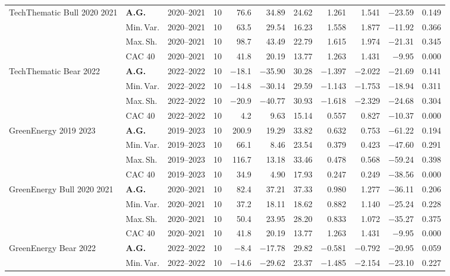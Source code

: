 \begin{longtable}{p{2.6cm} l c c r r r r r r r}
\midrule
TechThematic Bull 2020 2021 & \textbf{A.G.} & 2020--2021 & 10 & 76.6 & 34.89 & 24.62 & 1.261 & 1.541 & $-$23.59 & 0.149 \\
 & Min.\,Var. & 2020--2021 & 10 & 63.5 & 29.54 & 16.23 & 1.558 & 1.877 & $-$11.92 & 0.366 \\
 & Max.\,Sh. & 2020--2021 & 10 & 98.7 & 43.49 & 22.79 & 1.615 & 1.974 & $-$21.31 & 0.345 \\
 & CAC 40 & 2020--2021 & 10 & 41.8 & 20.19 & 13.77 & 1.263 & 1.431 & $-$9.95 & 0.000 \\
\midrule
TechThematic Bear 2022 & \textbf{A.G.} & 2022--2022 & 10 & $-$18.1 & $-$35.90 & 30.28 & $-$1.397 & $-$2.022 & $-$21.69 & 0.141 \\
 & Min.\,Var. & 2022--2022 & 10 & $-$14.8 & $-$30.14 & 29.59 & $-$1.143 & $-$1.753 & $-$18.94 & 0.311 \\
 & Max.\,Sh. & 2022--2022 & 10 & $-$20.9 & $-$40.77 & 30.93 & $-$1.618 & $-$2.329 & $-$24.68 & 0.304 \\
 & CAC 40 & 2022--2022 & 10 & 4.2 & 9.63 & 15.14 & 0.557 & 0.827 & $-$10.37 & 0.000 \\
\midrule
GreenEnergy 2019 2023 & \textbf{A.G.} & 2019--2023 & 10 & 200.9 & 19.29 & 33.82 & 0.632 & 0.753 & $-$61.22 & 0.194 \\
 & Min.\,Var. & 2019--2023 & 10 & 66.1 & 8.46 & 23.54 & 0.379 & 0.423 & $-$47.60 & 0.291 \\
 & Max.\,Sh. & 2019--2023 & 10 & 116.7 & 13.18 & 33.46 & 0.478 & 0.568 & $-$59.24 & 0.398 \\
 & CAC 40 & 2019--2023 & 10 & 34.9 & 4.90 & 17.93 & 0.247 & 0.249 & $-$38.56 & 0.000 \\
\midrule
GreenEnergy Bull 2020 2021 & \textbf{A.G.} & 2020--2021 & 10 & 82.4 & 37.21 & 37.33 & 0.980 & 1.277 & $-$36.11 & 0.206 \\
 & Min.\,Var. & 2020--2021 & 10 & 37.2 & 18.11 & 18.62 & 0.882 & 1.140 & $-$25.24 & 0.228 \\
 & Max.\,Sh. & 2020--2021 & 10 & 50.4 & 23.95 & 28.20 & 0.833 & 1.072 & $-$35.27 & 0.375 \\
 & CAC 40 & 2020--2021 & 10 & 41.8 & 20.19 & 13.77 & 1.263 & 1.431 & $-$9.95 & 0.000 \\
\midrule
GreenEnergy Bear 2022 & \textbf{A.G.} & 2022--2022 & 10 & $-$8.4 & $-$17.78 & 29.82 & $-$0.581 & $-$0.792 & $-$20.95 & 0.059 \\
 & Min.\,Var. & 2022--2022 & 10 & $-$14.6 & $-$29.62 & 23.37 & $-$1.485 & $-$2.154 & $-$23.10 & 0.227 \\

\end{longtable}
